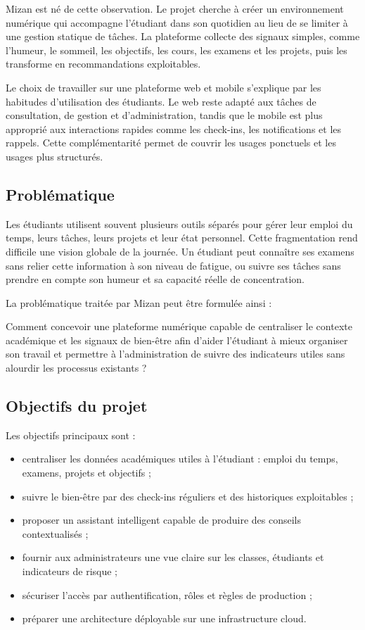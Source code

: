 \documentclass{rapportENSET}
\begin{document}
Mizan est né de cette observation. Le projet cherche à créer un environnement numérique qui accompagne l'étudiant dans son quotidien au lieu de se limiter à une gestion statique de tâches. La plateforme collecte des signaux simples, comme l'humeur, le sommeil, les objectifs, les cours, les examens et les projets, puis les transforme en recommandations exploitables.

Le choix de travailler sur une plateforme web et mobile s'explique par les habitudes d'utilisation des étudiants. Le web reste adapté aux tâches de consultation, de gestion et d'administration, tandis que le mobile est plus approprié aux interactions rapides comme les check-ins, les notifications et les rappels. Cette complémentarité permet de couvrir les usages ponctuels et les usages plus structurés.

\subsection*{Problématique}
Les étudiants utilisent souvent plusieurs outils séparés pour gérer leur emploi du temps, leurs tâches, leurs projets et leur état personnel. Cette fragmentation rend difficile une vision globale de la journée. Un étudiant peut connaître ses examens sans relier cette information à son niveau de fatigue, ou suivre ses tâches sans prendre en compte son humeur et sa capacité réelle de concentration.

La problématique traitée par Mizan peut être formulée ainsi :
\begin{tcolorbox}[colback=softgray,colframe=mizanblue,title=Problématique]
Comment concevoir une plateforme numérique capable de centraliser le contexte académique et les signaux de bien-être afin d'aider l'étudiant à mieux organiser son travail et permettre à l'administration de suivre des indicateurs utiles sans alourdir les processus existants ?
\end{tcolorbox}

\subsection*{Objectifs du projet}
Les objectifs principaux sont :
\begin{itemize}
    \item centraliser les données académiques utiles à l'étudiant : emploi du temps, examens, projets et objectifs ;
    \item suivre le bien-être par des check-ins réguliers et des historiques exploitables ;
    \item proposer un assistant intelligent capable de produire des conseils contextualisés ;
    \item fournir aux administrateurs une vue claire sur les classes, étudiants et indicateurs de risque ;
    \item sécuriser l'accès par authentification, rôles et règles de production ;
    \item préparer une architecture déployable sur une infrastructure cloud.
\end{itemize}
\end{document}

